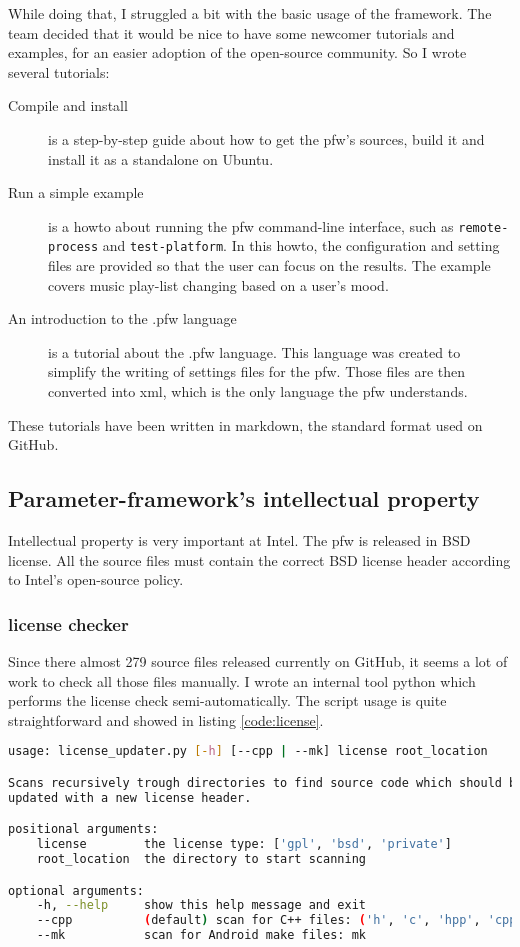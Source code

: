 While doing that, I struggled a bit with the basic usage of the framework. The
team decided that it would be nice to have some newcomer tutorials and examples,
for an easier adoption of the open-source community. So I wrote several
tutorials:
\begin{description}
    \item[Compile and install]
        is a step-by-step guide about how to get the \gls{pfw}'s sources,
        build it and install it as a standalone on Ubuntu.
    \item[Run a simple example]
        is a howto about running the \gls{pfw} command-line interface,
        such as \lstinline{remote-process} and \lstinline {test-platform}.  In
        this howto, the configuration and setting files are provided so that
        the user can focus on the results. The example covers music play-list
        changing based on a user's mood.
    \item[An introduction to the .pfw language]\label{desc:pfw-language}
        is a tutorial about the .pfw language. This language was
        created to simplify the writing of settings files for the
        \gls{pfw}. Those files are then converted into \gls{xml}, which is
        the only language the \gls{pfw} understands.
\end{description}
These tutorials have been written in \gls{markdown}, the standard format used
on GitHub.

\subsection{Parameter-framework's intellectual property}
Intellectual property is very important at Intel. The \gls{pfw} is released in
BSD license. All the source files must contain the correct BSD license header according
to Intel's open-source policy.

\subsubsection{license checker}
Since there almost 279 source files released currently on GitHub, it seems a lot of
work to check all those files manually.
I wrote an internal tool \gls{python} which performs the license check semi-automatically.
The script usage is quite straightforward and showed in listing \ref{code:license}.

\begin{lstlisting}[language=bash, caption=License checker usage, label=code:license]
usage: license_updater.py [-h] [--cpp | --mk] license root_location

Scans recursively trough directories to find source code which should be
updated with a new license header.

positional arguments:
    license        the license type: ['gpl', 'bsd', 'private']
    root_location  the directory to start scanning

optional arguments:
    -h, --help     show this help message and exit
    --cpp          (default) scan for C++ files: ('h', 'c', 'hpp', 'cpp')
    --mk           scan for Android make files: mk
\end{lstlisting}


